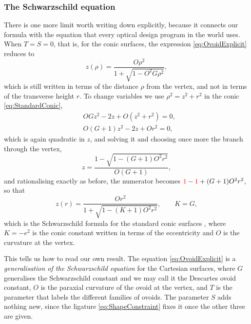                 \subsubsection{The Schwarzschild equation}

                    There is one more limit worth writing down explicitly, because it connects our formula with the equation that every optical design program in the world uses. When $T = S = 0$, that is, for the conic surfaces, the expression \ref{eq:OvoidExplicit} reduces to
                    \begin{equation}\label{eq:SagConic}
                        z(\rho) = \frac{O\rho^2}{1+\sqrt{1-O^2G\rho^2}},
                    \end{equation}
                    which is still written in terms of the distance $\rho$ from the vertex, and not in terms of the transverse height $r$. To change variables we use $\rho^2 = z^2 + r^2$ in the conic \ref{eq:StandardConic},
                    \begin{align*}
                        & OGz^2 - 2z + O\left(z^2+r^2\right) = 0,\\
                        & O\left( G+1 \right)z^2 - 2z + Or^2 = 0,
                    \end{align*}
                    which is again quadratic in $z$, and solving it and choosing once more the branch through the vertex,
                    \begin{equation*}
                        z = \frac{1 - \sqrt{1 - \left(G+1\right)O^2r^2}}{O\left(G+1\right)},
                    \end{equation*}
                    and rationalising exactly as before, the numerator becomes ${\color{red}1} - {\color{red}1} + (G+1)O^2r^2$, so that
                    \begin{equation}\label{eq:Schwarzschild}
                        z(r) = \frac{Or^2}{1+\sqrt{1 - \left( K+1 \right)O^2r^2}}, \qquad K = G,
                    \end{equation}
                    which is the Schwarzschild formula for the standard conic surfaces \citep{schwarzschild1905untersuchungen}, where $K=-e^2$ is the conic constant written in terms of the eccentricity and $O$ is the curvature at the vertex.

                    This tells us how to read our own result. The equation \ref{eq:OvoidExplicit} is a \textit{generalisation of the Schwarzschild equation} for the Cartesian surfaces, where $G$ generalises the Schwarzschild constant and we may call it the Descartes ovoid constant, $O$ is the paraxial curvature of the ovoid at the vertex, and $T$ is the parameter that labels the different families of ovoids. The parameter $S$ adds nothing new, since the ligature \ref{eq:ShapeConstraint} fixes it once the other three are given.

